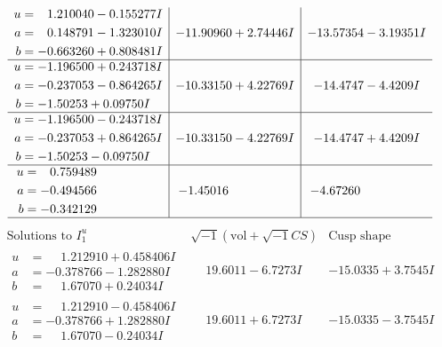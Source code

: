 \documentclass[1p]{elsarticle_modified}
\theoremstyle{definition}
\newcommand{\I}{\sqrt{-1}}
\begin{document}
$$\begin{array}{c|c|c}
\begin{aligned}
u &= \phantom{-}1.210040 - 0.155277 I \\
a &= \phantom{-}0.148791 - 1.323010 I \\
b &= -0.663260 + 0.808481 I\end{aligned}
 & -11.90960 + 2.74446 I & -13.57354 - 3.19351 I \\ \hline\begin{aligned}
u &= -1.196500 + 0.243718 I \\
a &= -0.237053 - 0.864265 I \\
b &= -1.50253 + 0.09750 I\end{aligned}
 & -10.33150 + 4.22769 I & -14.4747 - 4.4209 I \\ \hline\begin{aligned}
u &= -1.196500 - 0.243718 I \\
a &= -0.237053 + 0.864265 I \\
b &= -1.50253 - 0.09750 I\end{aligned}
 & -10.33150 - 4.22769 I & -14.4747 + 4.4209 I \\ \hline\begin{aligned}
u &= \phantom{-}0.759489\phantom{ +0.000000I} \\
a &= -0.494566\phantom{ +0.000000I} \\
b &= -0.342129\phantom{ +0.000000I}\end{aligned}
 & -1.45016\phantom{ +0.000000I} & -4.67260\phantom{ +0.000000I}\\
 \hline 
 \end{array}$$\newpage$$\begin{array}{c|c|c}  
\text{Solutions to }I^u_{1}& \I (\text{vol} + \sqrt{-1}CS) & \text{Cusp shape}\\
 \hline 
\begin{aligned}
u &= \phantom{-}1.212910 + 0.458406 I \\
a &= -0.378766 - 1.282880 I \\
b &= \phantom{-}1.67070 + 0.24034 I\end{aligned}
 & \phantom{-}19.6011 - 6.7273 I & -15.0335 + 3.7545 I \\ \hline\begin{aligned}
u &= \phantom{-}1.212910 - 0.458406 I \\
a &= -0.378766 + 1.282880 I \\
b &= \phantom{-}1.67070 - 0.24034 I\end{aligned}
 & \phantom{-}19.6011 + 6.7273 I & -15.0335 - 3.7545 I \\ \hline\begin{aligned}

\end{aligned}
\end{array}$$
\end{document}
